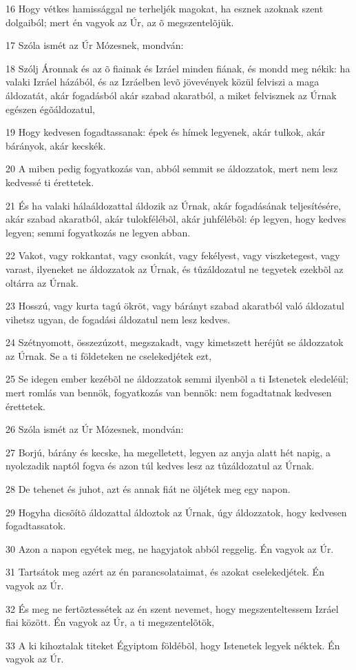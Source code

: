 \par 16 Hogy vétkes hamissággal ne terheljék magokat, ha esznek azoknak szent dolgaiból; mert én vagyok az Úr, az õ megszentelõjük.
\par 17 Szóla ismét az Úr Mózesnek, mondván:
\par 18 Szólj Áronnak és az õ fiainak és Izráel minden fiának, és mondd meg nékik: ha valaki Izráel házából, és az Izráelben levõ jövevények közül felviszi a maga áldozatát, akár fogadásból akár szabad akaratból, a miket felvisznek az Úrnak egészen égõáldozatul,
\par 19 Hogy kedvesen fogadtassanak: épek és hímek legyenek, akár tulkok, akár bárányok, akár kecskék.
\par 20 A miben pedig fogyatkozás van, abból semmit se áldozzatok, mert nem lesz kedvessé ti érettetek.
\par 21 És ha valaki hálaáldozattal áldozik az Úrnak, akár fogadásának teljesítésére, akár szabad akaratból, akár tulokfélébõl, akár juhfélébõl: ép legyen, hogy kedves legyen; semmi fogyatkozás ne legyen abban.
\par 22 Vakot, vagy rokkantat, vagy csonkát, vagy fekélyest, vagy viszketegest, vagy varast, ilyeneket ne áldozzatok az Úrnak, és tûzáldozatul ne tegyetek ezekbõl az oltárra az Úrnak.
\par 23 Hosszú, vagy kurta tagú ökröt, vagy bárányt szabad akaratból való áldozatul vihetsz ugyan, de fogadási áldozatul nem lesz kedves.
\par 24 Szétnyomott, összezúzott, megszakadt, vagy kimetszett heréjût se áldozzatok az Úrnak. Se a ti földeteken ne cselekedjétek ezt,
\par 25 Se idegen ember kezébõl ne áldozzatok semmi ilyenbõl a ti Istenetek eledeléül; mert romlás van bennök, fogyatkozás van bennök: nem fogadtatnak kedvesen érettetek.
\par 26 Szóla ismét az Úr Mózesnek, mondván:
\par 27 Borjú, bárány és kecske, ha megelletett, legyen az anyja alatt hét napig, a nyolczadik naptól fogva és azon túl kedves lesz az tûzáldozatul az Úrnak.
\par 28 De tehenet és juhot, azt és annak fiát ne öljétek meg egy napon.
\par 29 Hogyha dicsõítõ áldozattal áldoztok az Úrnak, úgy áldozzatok, hogy kedvesen fogadtassatok.
\par 30 Azon a napon egyétek meg, ne hagyjatok abból reggelig. Én vagyok az Úr.
\par 31 Tartsátok meg azért az én parancsolataimat, és azokat cselekedjétek. Én vagyok az Úr.
\par 32 És meg ne fertõztessétek az én szent nevemet, hogy megszenteltessem Izráel fiai között. Én vagyok az Úr, a ti megszentelõtök,
\par 33 A ki kihoztalak titeket Égyiptom földébõl, hogy Istenetek legyek néktek. Én vagyok az Úr.

